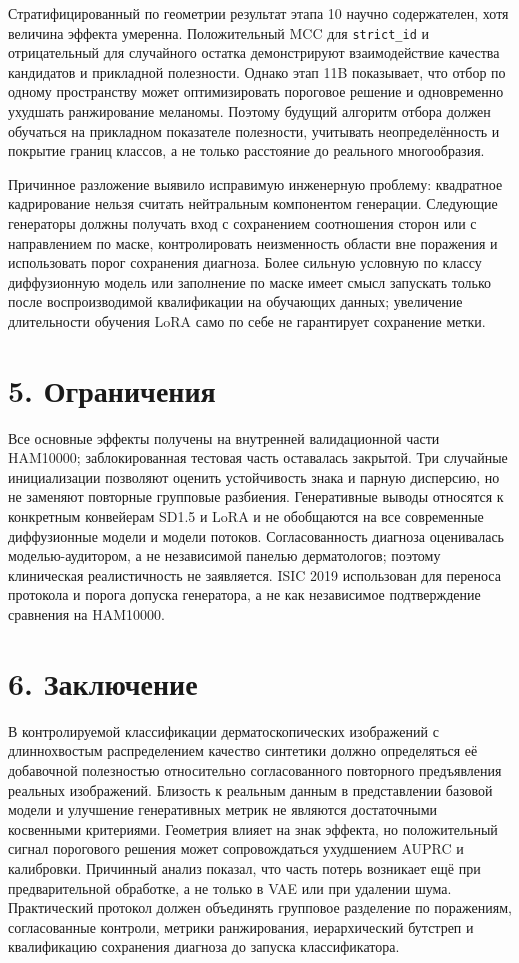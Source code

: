 \documentclass[12pt,a4paper]{article}
\begin{document}
Стратифицированный по геометрии результат этапа 10 научно содержателен, хотя величина эффекта умеренна. Положительный MCC для \texttt{strict\_id} и отрицательный для случайного остатка демонстрируют взаимодействие качества кандидатов и прикладной полезности. Однако этап 11B показывает, что отбор по одному пространству может оптимизировать пороговое решение и одновременно ухудшать ранжирование меланомы. Поэтому будущий алгоритм отбора должен обучаться на прикладном показателе полезности, учитывать неопределённость и покрытие границ классов, а не только расстояние до реального многообразия.

Причинное разложение выявило исправимую инженерную проблему: квадратное кадрирование нельзя считать нейтральным компонентом генерации. Следующие генераторы должны получать вход с сохранением соотношения сторон или с направлением по маске, контролировать неизменность области вне поражения и использовать порог сохранения диагноза. Более сильную условную по классу диффузионную модель или заполнение по маске имеет смысл запускать только после воспроизводимой квалификации на обучающих данных; увеличение длительности обучения LoRA само по себе не гарантирует сохранение метки.

\section*{5. Ограничения}

Все основные эффекты получены на внутренней валидационной части HAM10000; заблокированная тестовая часть оставалась закрытой. Три случайные инициализации позволяют оценить устойчивость знака и парную дисперсию, но не заменяют повторные групповые разбиения. Генеративные выводы относятся к конкретным конвейерам SD1.5 и LoRA и не обобщаются на все современные диффузионные модели и модели потоков. Согласованность диагноза оценивалась моделью-аудитором, а не независимой панелью дерматологов; поэтому клиническая реалистичность не заявляется. ISIC 2019 использован для переноса протокола и порога допуска генератора, а не как независимое подтверждение сравнения на HAM10000.

\section*{6. Заключение}

В контролируемой классификации дерматоскопических изображений с длиннохвостым распределением качество синтетики должно определяться её добавочной полезностью относительно согласованного повторного предъявления реальных изображений. Близость к реальным данным в представлении базовой модели и улучшение генеративных метрик не являются достаточными косвенными критериями. Геометрия влияет на знак эффекта, но положительный сигнал порогового решения может сопровождаться ухудшением AUPRC и калибровки. Причинный анализ показал, что часть потерь возникает ещё при предварительной обработке, а не только в VAE или при удалении шума. Практический протокол должен объединять групповое разделение по поражениям, согласованные контроли, метрики ранжирования, иерархический бутстреп и квалификацию сохранения диагноза до запуска классификатора.
\end{document}
